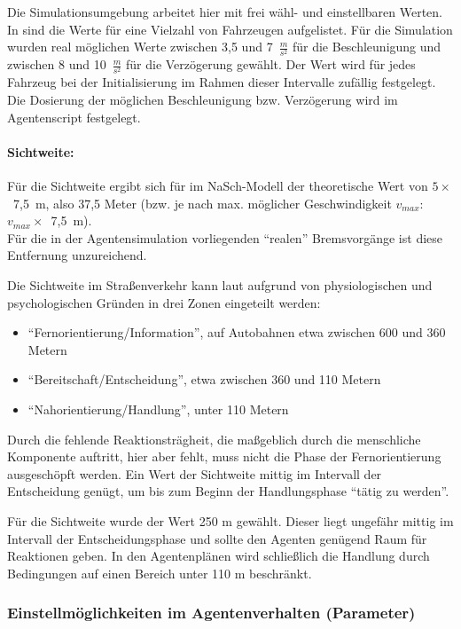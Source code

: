 Die Simulationsumgebung arbeitet hier mit frei wähl- und einstellbaren Werten. 
In \cite{unfallrekonstruktion} sind die Werte für eine Vielzahl von Fahrzeugen aufgelistet. 
Für die Simulation wurden real möglichen Werte zwischen 3,5 und \mbox{7 $\frac{m}{s^{2}}$} für die Beschleunigung und zwischen 8 und \mbox{10 $\frac{m}{s^{2}}$} für die Verzögerung gewählt.
Der Wert wird für jedes Fahrzeug bei der Initialisierung im Rahmen dieser Intervalle zufällig festgelegt.
Die Dosierung der möglichen Beschleunigung bzw. Verzögerung wird im Agentenscript festgelegt.

\paragraph*{Sichtweite:}
\label{sec:sichtweite}
Für die Sichtweite ergibt sich für im NaSch-Modell der theoretische Wert von \mbox{$ 5 \times $ 7,5 m}, also 37,5 Meter (bzw. je nach max. möglicher Geschwindigkeit  $ v_{max} $: \mbox{$ v_{max} \times $ 7,5 m}).
\\
Für die in der Agentensimulation vorliegenden \enquote{realen} Bremsvorgänge ist diese Entfernung unzureichend. 

Die Sichtweite im Straßenverkehr kann laut \cite{sichtweite} aufgrund von physiologischen und psychologischen Gründen in drei Zonen eingeteilt werden:
\begin{itemize}
\itemsep0em
	\item \enquote{Fernorientierung/Information}, auf Autobahnen etwa zwischen 600 und 360 Metern
	\item \enquote{Bereitschaft/Entscheidung}, etwa zwischen 360 und 110 Metern
	\item \enquote{Nahorientierung/Handlung}, unter 110 Metern
\end{itemize}

Durch die fehlende Reaktionsträgheit, die maßgeblich durch die menschliche Komponente auftritt, hier aber fehlt, muss nicht die Phase der Fernorientierung ausgeschöpft werden. 
Ein Wert der Sichtweite mittig im Intervall der Entscheidung genügt, um bis zum Beginn der Handlungsphase \enquote{tätig zu werden}.

Für die Sichtweite wurde der Wert 250 m gewählt.
Dieser liegt ungefähr mittig im Intervall der Entscheidungsphase und sollte den Agenten genügend Raum für Reaktionen geben. 
In den Agentenplänen wird schließlich die Handlung durch Bedingungen auf einen Bereich unter 110 m beschränkt.


\subsubsection{Einstellmöglichkeiten im Agentenverhalten (Parameter)}

